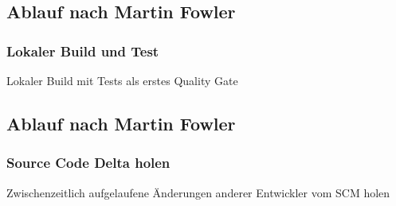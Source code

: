 \documentclass[hyperref={pdfpagelabels=false}]{beamer}
\begin{document}
\subsection{Ablauf nach Martin Fowler}
\begin{frame} [t]
\frametitle{Lokaler Build und Test}
\begin{figure}[h]
  \centering
\end{figure}
\vspace{0.5cm} 
Lokaler Build mit Tests als erstes Quality Gate
\end{frame}

\subsection{Ablauf nach Martin Fowler}
\begin{frame} [t]
\frametitle{Source Code Delta holen}
\begin{figure}[h]
  \centering
\end{figure}
\vspace{0.5cm} 
Zwischenzeitlich aufgelaufene Änderungen anderer Entwickler vom SCM holen
\end{frame}
\end{document}
